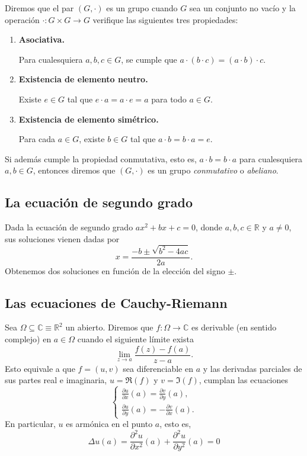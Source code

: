 \documentclass[a4paper,10pt]{article}
\theoremstyle{teorema}
\theoremstyle{plano}
\theoremstyle{titulo}
\begin{document}
Diremos que el par $(G,\cdot)$ es un grupo cuando $G$ sea un conjunto no vacío y la operación $\cdot:G\times G\rightarrow G$ verifique las siguientes tres propiedades:
\begin{enumerate}[label=(\alph*)]
 \item \textbf{Asociativa.}\par Para cualesquiera $a,b,c\in G$, se cumple que $a\cdot (b\cdot c)=(a\cdot b)\cdot c$.
 \item \textbf{Existencia de elemento neutro.}\par Existe $e\in G$ tal que $e\cdot a=a\cdot e=a$ para todo $a\in G$.
 \item \textbf{Existencia de elemento simétrico.}\par Para cada $a\in G$, existe $b\in G$ tal que $a\cdot b=b\cdot a=e$.
\end{enumerate}
Si además cumple la propiedad conmutativa, esto es, $a\cdot b=b\cdot a$ para cualesquiera $a,b\in G$, entonces diremos que $(G,\cdot)$ es un grupo \emph{conmutativo} o \emph{abeliano}.


\subsection{La ecuación de segundo grado}
Dada la ecuación de segundo grado $ax^2+bx+c=0$, donde $a,b,c\in\mathbb{R}$ y $a\neq 0$, sus soluciones vienen dadas por
\[x=\frac{-b\pm\sqrt{b^2-4ac}}{2a}.\]
Obtenemos dos soluciones en función de la elección del signo $\pm$.

\subsection{Las ecuaciones de Cauchy-Riemann}

Sea $\Omega\subseteq\mathbb{C}\equiv\mathbb{R}^2$ un abierto. Diremos que $f:\Omega\rightarrow\mathbb{C}$ es derivable (en sentido complejo) en $a\in\Omega$ cuando el siguiente límite exista
\[\lim_{z\to a}\frac{f(z)-f(a)}{z-a}.\]
Esto equivale a que $f=(u,v)$ sea diferenciable en $a$ y las derivadas parciales de sus partes real e imaginaria, $u=\Re(f)$ y $v=\Im(f)$, cumplan las ecuaciones
\[\begin{cases}
\frac{\partial u}{\partial x}(a)=\frac{\partial v}{\partial y}(a), \\
\frac{\partial u}{\partial y}(a)=-\frac{\partial v}{\partial x}(a).
\end{cases}\]
En particular, $u$ es armónica en el punto $a$, esto es,
\[\Delta u(a)=\frac{\partial^2 u}{\partial x^2}(a)+\frac{\partial^2 u}{\partial y^2}(a)=0\]
\end{document}
